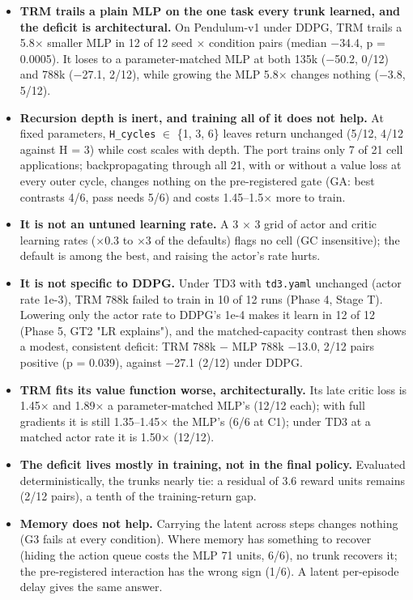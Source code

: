 \documentclass[11pt]{article}
\begin{document}
\begin{itemize}
\item \textbf{TRM trails a plain MLP on the one task every trunk learned, and the deficit is architectural.} On Pendulum-v1 under DDPG, TRM trails a 5.8$\times$ smaller MLP in 12 of 12 seed $\times$ condition pairs (median $-$34.4, p = 0.0005). It loses to a parameter-matched MLP at both 135k ($-$50.2, 0/12) and 788k ($-$27.1, 2/12), while growing the MLP 5.8$\times$ changes nothing ($-$3.8, 5/12).
\item \textbf{Recursion depth is inert, and training all of it does not help.} At fixed parameters, \texttt{H\_cycles} $\in$ \{1, 3, 6\} leaves return unchanged (5/12, 4/12 against H = 3) while cost scales with depth. The port trains only 7 of 21 cell applications; backpropagating through all 21, with or without a value loss at every outer cycle, changes nothing on the pre-registered gate (GA: best contrasts 4/6, pass needs 5/6) and costs 1.45--1.5$\times$ more to train.
\item \textbf{It is not an untuned learning rate.} A 3 $\times$ 3 grid of actor and critic learning rates ($\times$0.3 to $\times$3 of the defaults) flags no cell (GC insensitive); the default is among the best, and raising the actor's rate hurts.
\item \textbf{It is not specific to DDPG.} Under TD3 with \texttt{td3.yaml} unchanged (actor rate 1e-3), TRM 788k failed to train in 10 of 12 runs (Phase 4, Stage T). Lowering only the actor rate to DDPG's 1e-4 makes it learn in 12 of 12 (Phase 5, GT2 "LR explains"), and the matched-capacity contrast then shows a modest, consistent deficit: TRM 788k $-$ MLP 788k $-$13.0, 2/12 pairs positive (p = 0.039), against $-$27.1 (2/12) under DDPG.
\item \textbf{TRM fits its value function worse, architecturally.} Its late critic loss is 1.45$\times$ and 1.89$\times$ a parameter-matched MLP's (12/12 each); with full gradients it is still 1.35--1.45$\times$ the MLP's (6/6 at C1); under TD3 at a matched actor rate it is 1.50$\times$ (12/12).
\item \textbf{The deficit lives mostly in training, not in the final policy.} Evaluated deterministically, the trunks nearly tie: a residual of 3.6 reward units remains (2/12 pairs), a tenth of the training-return gap.
\item \textbf{Memory does not help.} Carrying the latent across steps changes nothing (G3 fails at every condition). Where memory has something to recover (hiding the action queue costs the MLP 71 units, 6/6), no trunk recovers it; the pre-registered interaction has the wrong sign (1/6). A latent per-episode delay gives the same answer.

\end{itemize}
\end{document}
